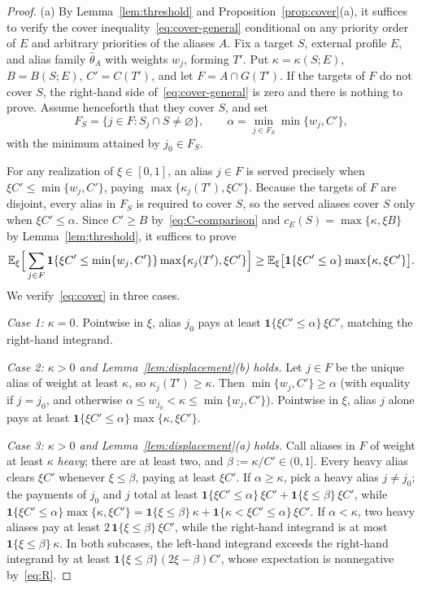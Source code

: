\documentclass[format=acmsmall, review=false]{acmart}
\newcommand{\E}{\mathbb{E}}
\theoremstyle{acmdefinition}%
\begin{document}
\begin{proof}
(a) By Lemma~\ref{lem:threshold} and
Proposition~\ref{prop:cover}(a), it suffices to verify the cover
inequality~\eqref{eq:cover-general} conditional on any priority
order of \(E\) and arbitrary priorities of the aliases \(A\). Fix
a target \(S\), external profile \(E\), and alias family
\(\hat\theta_A\) with weights \(w_j\), forming \(T'\). Put
\(\kappa=\kappa(S;E)\), \(B=B(S;E)\), \(C'=C(T')\), and let
\(F=A\cap G(T')\). If the targets of \(F\) do not cover \(S\), the
right-hand side of~\eqref{eq:cover-general} is zero and there is
nothing to prove. Assume henceforth that they cover \(S\), and set
\[
F_S=\{j\in F:S_j\cap S\ne\varnothing\},
\qquad
\alpha=\min_{j\in F_S}\min\{w_j,C'\},
\]
with the minimum attained by \(j_0\in F_S\).

For any realization of \(\xi\in[0,1]\), an alias \(j\in F\) is
served precisely when \(\xi C'\le\min\{w_j,C'\}\), paying
\(\max\{\kappa_j(T'),\xi C'\}\). Because the targets of \(F\) are
disjoint, every alias in \(F_S\) is required to cover \(S\), so
the served aliases cover \(S\) only when \(\xi C'\le\alpha\).
Since \(C'\ge B\) by~\eqref{eq:C-comparison} and
\(c_E(S)=\max\{\kappa,\xi B\}\) by Lemma~\ref{lem:threshold}, it
suffices to prove
\begin{equation}\label{eq:cover}
\E_\xi\Bigl[\,
\sum_{j\in F}
\mathbf{1}\{\xi C'\le\min\{w_j,C'\}\}
\max\{\kappa_j(T'),\xi C'\}
\Bigr]
\ge
\E_\xi\bigl[
\mathbf{1}\{\xi C'\le\alpha\}\max\{\kappa,\xi C'\}
\bigr].
\end{equation}
We verify~\eqref{eq:cover} in three cases.

\emph{Case 1: \(\kappa=0\).} Pointwise in \(\xi\), alias \(j_0\)
pays at least \(\mathbf{1}\{\xi C'\le\alpha\}\,\xi C'\), matching
the right-hand integrand.

\emph{Case 2: \(\kappa>0\) and Lemma~\ref{lem:displacement}(b)
holds.} Let \(j\in F\) be the unique alias of weight at least
\(\kappa\), so \(\kappa_j(T')\ge\kappa\). Then
\(\min\{w_j,C'\}\ge\alpha\) (with equality if \(j=j_0\), and
otherwise \(\alpha\le w_{j_0}<\kappa\le\min\{w_j,C'\}\)).
Pointwise in \(\xi\), alias \(j\) alone pays at least
\(\mathbf{1}\{\xi C'\le\alpha\}\max\{\kappa,\xi C'\}\).

\emph{Case 3: \(\kappa>0\) and Lemma~\ref{lem:displacement}(a)
holds.} Call aliases in \(F\) of weight at least \(\kappa\)
\emph{heavy}; there are at least two, and
\(\beta:=\kappa/C'\in(0,1]\). Every heavy alias clears \(\xi C'\)
whenever \(\xi\le\beta\), paying at least \(\xi C'\). If
\(\alpha\ge\kappa\), pick a heavy alias \(j\ne j_0\); the payments
of \(j_0\) and \(j\) total at least
\(\mathbf{1}\{\xi C'\le\alpha\}\,\xi C'
+\mathbf{1}\{\xi\le\beta\}\,\xi C'\), while
\(\mathbf{1}\{\xi C'\le\alpha\}\max\{\kappa,\xi C'\}
=\mathbf{1}\{\xi\le\beta\}\,\kappa
+\mathbf{1}\{\kappa<\xi C'\le\alpha\}\,\xi C'\).
If \(\alpha<\kappa\), two heavy aliases pay at least
\(2\,\mathbf{1}\{\xi\le\beta\}\,\xi C'\), while the right-hand
integrand is at most \(\mathbf{1}\{\xi\le\beta\}\,\kappa\). In
both subcases, the left-hand integrand exceeds the right-hand
integrand by at least \(\mathbf{1}\{\xi\le\beta\}(2\xi-\beta)C'\),
whose expectation is nonnegative by~\eqref{eq:R}.


\end{proof}
\end{document}
